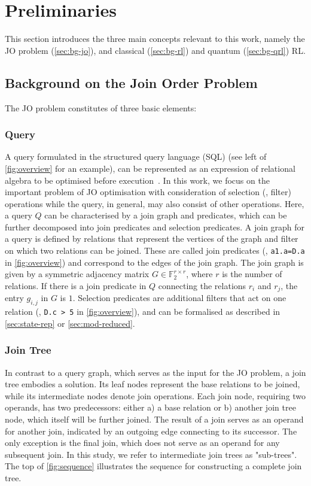 \documentclass[10pt, conference]{IEEEtran}
\begin{document}
\section{Preliminaries}
\label{sec:preliminaries}

This section introduces the three main concepts relevant to this work, namely the JO problem (\autoref{sec:bg-jo}), and classical (\autoref{sec:bg-rl}) and quantum (\autoref{sec:bg-qrl}) RL.

\subsection{Background on the Join Order Problem}
\label{sec:bg-jo}

The JO problem constitutes of three basic elements:

\subsubsection{Query}
A query formulated in the structured query language (SQL) (see left of \autoref{fig:overview} for an example), can be represented as an expression of relational algebra to be optimised before execution~\cite{Smith1975}.
In this work, we focus on the important problem of JO optimisation with consideration of selection (\ie, filter) operations while the query, in general, may also consist of other operations.
Here, a query $Q$ can be characterised by a join graph and predicates, which can be further decomposed into join predicates and selection predicates.
A join graph for a query is defined by relations that represent the vertices of the graph and filter on which two relations can be joined. These are called join predicates (\eg, \texttt{a1.a=D.a} in \autoref{fig:overview}) and correspond to the edges of the join graph.
The join graph is given by a symmetric adjacency matrix $G \in \mathbb{F}_2^{r\times r}$, where $r$ is the number of relations. If there is a join predicate in $Q$ connecting the relations $r_i$ and $r_j$, the entry $g_{i, j}$ in $G$ is $1$.
Selection predicates are additional filters that act on one relation (\eg, \texttt{D.c > 5} in \autoref{fig:overview}), and can be formalised as described in \autoref{sec:state-rep} or \autoref{sec:mod-reduced}.

\subsubsection{Join Tree}
In contrast to a query graph, which serves as the input for the JO problem, a join tree embodies a solution.
Its leaf nodes represent the base relations to be joined, while its intermediate nodes denote join operations.
Each join node, requiring two operands, has two predecessors: either a) a base relation or b) another join tree node, which itself will be further joined.
The result of a join serves as an operand for another join, indicated by an outgoing edge connecting to its successor.
The only exception is the final join, which does not serve as an operand for any subsequent join.
In this study, we refer to intermediate join trees as "sub-trees".
The top of \autoref{fig:sequence} illustrates the sequence for constructing a complete join tree.
\end{document}
